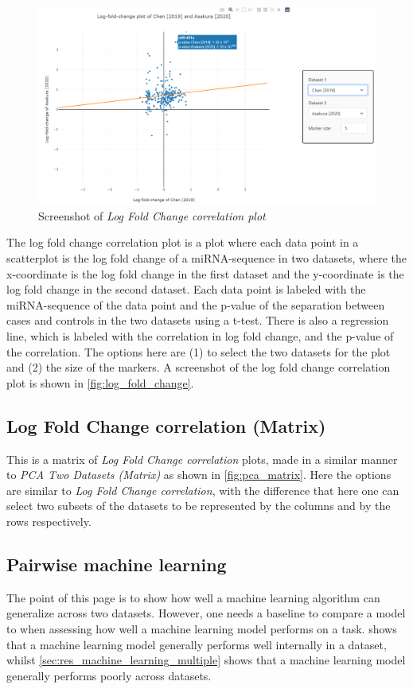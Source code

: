 {{{{{{{{{{{{{{{\begin{figure}
    \centering
    \includegraphics[width=\textwidth]{figs/webapp_screenshots/log_fold_change.png}
    \caption{Screenshot of \textit{Log Fold Change correlation plot}}
    \label{fig:log_fold_change}
\end{figure}

The log fold change correlation plot is a plot where each data point in a scatterplot is the log fold change of a miRNA-sequence in two datasets, where the x-coordinate is the log fold change in the first dataset and the y-coordinate is the log fold change in the second dataset. Each data point is labeled with the miRNA-sequence of the data point and the p-value of the separation between cases and controls in the two datasets using a t-test. There is also a regression line, which is labeled with the correlation in log fold change, and the p-value of the correlation. The options here are (1) to select the two datasets for the plot and (2) the size of the markers. A screenshot of the log fold change correlation plot is shown in \autoref{fig:log_fold_change}.

\subsection{Log Fold Change correlation (Matrix)}

This is a matrix of \textit{Log Fold Change correlation} plots, made in a similar manner to \textit{PCA Two Datasets (Matrix)} as shown in \autoref{fig:pca_matrix}. Here the options are similar to \textit{Log Fold Change correlation}, with the difference that here one can select two subsets of the datasets to be represented by the columns and by the rows respectively.

\subsection{Pairwise machine learning}
The point of this page is to show how well a machine learning algorithm can generalize across two datasets. However, one needs a baseline to compare a model to when assessing how well a machine learning model performs on a task.  shows that a machine learning model generally performs well internally in a dataset, whilst \autoref{sec:res_machine_learning_multiple} shows that a machine learning model generally performs poorly across datasets. 

}}}}}}}}}}}}}}}
